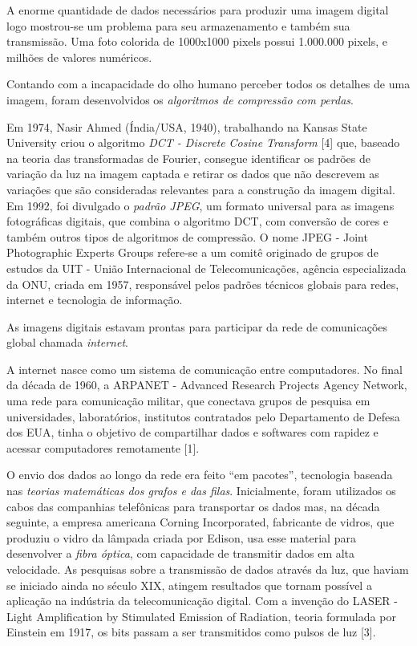 \documentclass{hipatia}
\begin{document}
A enorme quantidade de dados necessários para produzir uma imagem digital logo mostrou-se um problema para seu armazenamento e também sua transmissão. Uma foto colorida de 1000x1000 pixels possui 1.000.000 pixels, e milhões de valores numéricos.

Contando com a incapacidade do olho humano perceber todos os detalhes de uma imagem, foram desenvolvidos os \textit{algoritmos de compressão com perdas}.

Em 1974, Nasir Ahmed (Índia/USA, 1940), trabalhando na Kansas State University criou o algoritmo \textit{DCT - Discrete Cosine Transform} [4] que, baseado na teoria das transformadas de Fourier, consegue identificar os padrões de variação da luz na imagem captada e retirar os dados que não descrevem as variações que são consideradas relevantes para a construção da imagem digital. Em 1992, foi divulgado o \textit{padrão JPEG}, um formato universal para as imagens fotográficas digitais, que combina o algoritmo DCT, com conversão de cores e também outros tipos de algoritmos de compressão. O nome JPEG - Joint Photographic Experts Groups refere-se a um comitê originado de grupos de estudos da UIT - União Internacional de Telecomunicações, agência especializada da ONU, criada em 1957, responsável pelos padrões técnicos globais para redes, internet e tecnologia de informação.

As imagens digitais estavam prontas para participar da rede de comunicações global chamada \textit{internet}.

A internet nasce como um sistema de comunicação entre computadores. No final da década de 1960, a ARPANET - Advanced Research Projects Agency Network, uma rede para comunicação militar, que conectava grupos de pesquisa em universidades, laboratórios, institutos contratados pelo Departamento de Defesa dos EUA, tinha o objetivo de compartilhar dados e softwares com rapidez e acessar computadores remotamente [1].

O envio dos dados ao longo da rede era feito ``em pacotes'', tecnologia baseada nas \textit{teorias matemáticas dos grafos e das filas}. Inicialmente, foram utilizados os cabos das companhias telefônicas para transportar os dados mas, na década seguinte, a empresa americana Corning Incorporated, fabricante de vidros, que produziu o vidro da lâmpada criada por Edison, usa esse material para desenvolver a \textit{fibra óptica}, com capacidade de transmitir dados em alta velocidade. As pesquisas sobre a transmissão de dados através da luz, que haviam se iniciado ainda no século XIX, atingem resultados que tornam possível a aplicação na indústria da telecomunicação digital. Com a invenção do LASER - Light Amplification by Stimulated Emission of Radiation, teoria formulada por Einstein em 1917, os bits passam a ser transmitidos como pulsos de luz  [3].
\end{document}
